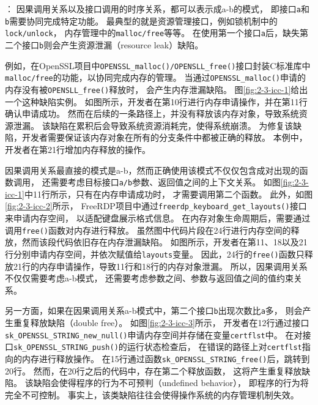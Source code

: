 ：
因果调用关系以及接口调用的时序关系，都可以表示成a-b的模式，
即接口\texttt{a}和\texttt{b}需要协同完成特定功能。
最典型的就是资源管理接口，例如锁机制中的\texttt{lock/unlock}，
内存管理中的\texttt{malloc/free}等等。
在使用第一个接口\texttt{a}后，缺失第二个接口\texttt{b}则会产生资源泄漏（resource leak）缺陷。




例如，在OpenSSL项目中\texttt{OPENSSL\_malloc()/OPENSLL\_free()}接口封装C标准库中
\texttt{malloc/free}的功能，以协同完成内存的管理。
当通过\texttt{OPENSSL\_malloc()}申请的内存没有被\texttt{OPENSLL\_free()}释放时，
会产生内存泄漏缺陷。
图\ref{fig:2-3-icc-1}给出一个这种缺陷实例。
如图所示，开发者在第10行进行内存申请操作，并在第11行确认申请成功。
然而在后续的一条路径上，并没有释放该内存对象，导致系统资源泄漏。
该缺陷在累积后会导致系统资源消耗完，使得系统崩溃。
为修复该缺陷，开发者需要保证该内存对象在所有的分支条件中都被正确的释放。
本例中，开发者在第21行增加内存释放的操作。



因果调用关系最直接的模式是a-b，然而正确使用该模式不仅仅包含成对出现的函数调用，
还需要考虑目标接口\texttt{a/b}参数、返回值之间的上下文关系。
如图\ref{fig:2-3-icc-1}中11行所示，只有在内存申请成功时，
才需要调用第二个函数。
此外，如图\ref{fig:2-3-icc-2}所示，
FreeRDP项目中通过\texttt{freerdp\_keyboard\_get\_layouts()}接口来申请内存空间，
以适配键盘展示格式信息。
在内存对象生命周期后，需要通过调用\texttt{free()}函数对内存进行释放。
虽然图中代码片段在24行进行内存空间的释放，然而该段代码依旧存在内存泄漏缺陷。
如图所示，开发者在第11、18以及21行分别申请内存空间，并依次赋值给\texttt{layouts}变量。
因此，24行的\texttt{free()}函数只释放21行的内存申请操作，导致11行和18行的内存对象泄漏。
所以，因果调用关系不仅仅需要考虑a-b模式，
还需要考虑参数之间、参数与返回值之间的值约束关系。

另一方面，如果在因果调用关系a-b模式中，第二个接口\texttt{b}出现次数比\texttt{a}多，
则会产生重复释放缺陷（double free）。
如图\ref{fig:2-3-icc-3}所示，
开发者在12行通过接口\texttt{sk\_OPENSSL\_STRING\_new\_null()}申请内存空间并存储在变量\texttt{certflst}中。
在对接口\texttt{sk\_OPENSSL\_STRING\_push()}的运行状态检查后，
在错误的路径上对\texttt{certflst}指向的内存进行释放操作。
在15行通过函数\texttt{sk\_OPENSSL\_STRING\_free()}后，跳转到20行。
然而，在20行之后的代码中，存在第二个释放函数，
这将产生重复释放缺陷。
该缺陷会使得程序的行为不可预判（undefined behavior），
即程序的行为将完全不可控制。
事实上，该类缺陷往往会使得操作系统的内存管理机制失效。

